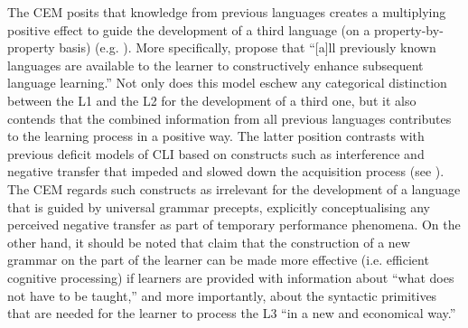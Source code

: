 \documentclass[output=paper,modfonts,nonflat,newtxmath]{langsci/langscibook}
\begin{document}
The CEM posits that knowledge from previous languages creates a multiplying positive effect to guide the development of a third language (on a property-by-property basis) (e.g. \citealt{BerkesFlynn2012, FlynnEtAl2004}). More specifically, \citet[7]{BerkesFlynn2012} propose that “[a]ll previously known languages are available to the learner to constructively enhance subsequent language learning.” Not only does this model eschew any categorical distinction between the L1 and the L2 for the development of a third one, but it also contends that the combined information from all previous languages contributes to the learning process in a positive way. The latter position contrasts with previous deficit models of CLI based on constructs such as interference and negative transfer that impeded and slowed down the acquisition process (see \citealt{Odlin1989}). The CEM regards such constructs as irrelevant for the development of a language that is guided by universal grammar precepts, explicitly conceptualising any perceived negative transfer as part of temporary performance phenomena. On the other hand, it should be noted that \citet[1--2]{BerkesFlynn2012} claim that the construction of a new grammar on the part of the learner can be made more effective (i.e. efficient cognitive processing) if learners are provided with information about “what does not have to be taught,” and more importantly, about the syntactic primitives that are needed for the learner to process the L3 “in a new and economical way.”
\end{document}
